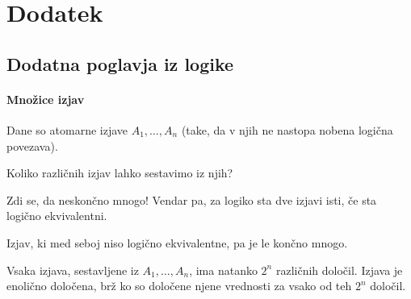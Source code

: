 \documentclass[11pt,paper=b5,footinclude,headinclude]{scrbook} %
\def\sledi {{~\Rightarrow~}}
\begin{document}
%
%
%
%
%
%
%
%
%
%
%
%
%
%




\appendix
\cleardoublepage\part*{Dodatek}

\chapter{Dodatna poglavja iz logike}
\subsection{Množice izjav}

Dane so atomarne izjave $A_1,\ldots, A_n$ (take, da v njih ne nastopa nobena logična povezava).

Koliko različnih izjav lahko sestavimo iz njih?

Zdi se, da neskončno mnogo! Vendar pa, za logiko sta dve izjavi isti, če sta logično ekvivalentni.

Izjav, ki med seboj niso logično ekvivalentne, pa je le končno mnogo.

Vsaka izjava, sestavljene iz $A_1,\ldots, A_n$, ima natanko $2^n$ različnih določil.
Izjava je enolično določena, brž ko so določene njene vrednosti za vsako od teh $2^n$ določil.
\end{document}
